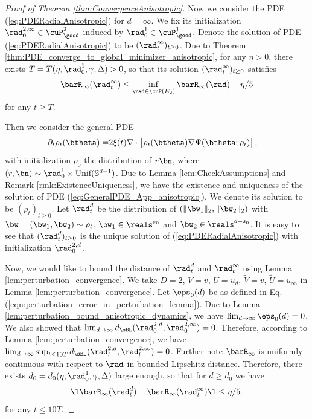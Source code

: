 \documentclass[11pt]{article}
\begin{document}
\begin{proof}[Proof of Theorem \ref{thm:ConvergenceAnisotropic}]
Now we consider the PDE (\ref{eq:PDERadialAnisotropic}) for $d = \infty$. We fix its initialization $\rad_{0}^{2, \infty} \in \cuP_{\good}^2$ induced by $\rad_0^1 \in \cuP_{\good}^1$. Denote the solution of PDE (\ref{eq:PDERadialAnisotropic}) to be $(\rad_t^\infty)_{t \ge 0}$. Due to Theorem \ref{thm:PDE_converge_to_global_minimizer_anisotropic}, for any $\eta > 0$, there exists $T = T(\eta, \rad_0^1, \gamma, \Delta) > 0$, so that its solution $(\rad_t^\infty)_{t \ge 0}$ satisfies
\[
\barR_\infty(\rad_t^\infty) \le \inf_{\rad \in \cuP(E_2)}\barR_\infty(\rad) + \eta / 5 
\]
for any $t \ge T$. 

Then we consider the general PDE
\begin{align}
%
\partial_t\rho_t(\btheta) =& 2 \xi(t) \nabla\cdot \big[\rho_t(\btheta)\nabla\Psi(\btheta;\rho_t)\big]\,, \label{eq:GeneralPDE_App_anisotropic}
%
\end{align}
with initialization $\rho_0$ the distribution of $r\bn$, where $(r, \bn) \sim \rad_0^1 \times \text{Unif}(\mathbb S^{d - 1})$. Due to Lemma \ref{lem:CheckAssumptions} and Remark \ref{rmk:ExistenceUniqueness}, we have the existence and uniqueness of the solution of PDE (\ref{eq:GeneralPDE_App_anisotropic}). We denote its solution to be $(\rho_t)_{t \ge 0}$. Let $\rad_t^d$ be the distribution of $(\| \bw_1 \|_2, \|\bw_2\|_2)$ with $\bw = (\bw_1, \bw_2) \sim \rho_t$, $\bw_1 \in \reals^{s_0}$ and $\bw_2 \in \reals^{d - s_0}$. It is easy to see that $(\rad_t^d)_{t \ge 0}$ is the unique solution of (\ref{eq:PDERadialAnisotropic}) with initialization $\rad_{0}^{2, d}$.


Now, we would like to bound the distance of $\rad_t^d$ and $\rad_t^\infty$ using Lemma \ref{lem:perturbation_convergence}. We take $D = 2$, $V = v$, $U = u_d$, $\tilde V = v$, $\tilde U = u_\infty$ in Lemma \ref{lem:perturbation_convergence}.  Let $\eps_0(d)$ be as defined in Eq. (\ref{eqn:perturbation_error_in_perturbation_lemma}). Due to Lemma \ref{lem:perturbation_bound_anisotropic_dynamics}, we have $\lim_{d \to \infty} \eps_0(d) = 0$. We also showed that $\lim_{d \to \infty} d_{\sBL}(\rad_{0}^{2, d}, \rad_{0}^{2, \infty} ) = 0$. Therefore, according to Lemma \ref{lem:perturbation_convergence}, we have $\lim_{d \to \infty} \sup_{t \le 10 T}d_{\sBL}(\rad_t^{2, d}, \rad_t^{2, \infty}) = 0$. Further note $\barR_\infty$ is uniformly continuous with respect to $\rad$ in bounded-Lipschitz distance. Therefore, there exists $d_0 = d_0 (\eta, \rad_0^1, \gamma, \Delta)$ large enough, so that for $d \ge d_0$ we have
\[
\l \barR_\infty(\rad_t^d) - \barR_\infty(\rad_t^\infty) \l \le \eta / 5.
\]
for any $t \le 10 T$. 


\end{proof}
\end{document}
